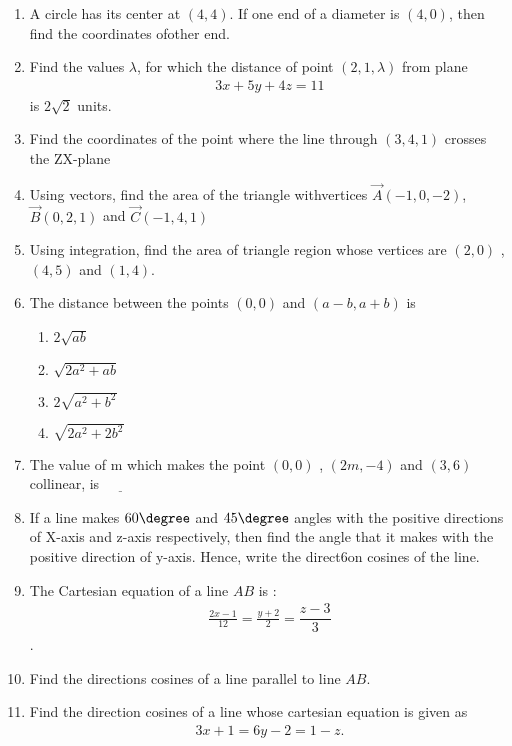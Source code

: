 \begin{enumerate}
\begin{enumerate}
\end{enumerate}
\item A circle has its center at $(4,4)$. If one end of a diameter is $(4,0)$, then find the coordinates ofother end.
\item Find the values $\lambda$, for which the distance of point $( 2,1, \lambda)$ from plane \begin{align}3x+5y+4z=11\end{align} is $2\sqrt{2}$ units.                            
\item Find the coordinates of the point where the line through $(3,4,1)$ crosses the ZX-plane
\item Using vectors, find the area of the triangle withvertices $\vec{A}(-1, 0, -2)$, $\vec{B}(0, 2, 1)$ and $\vec{C}(-1, 4,1)$ 
\item Using integration, find the area of triangle region whose vertices are $(2,0)$ , $(4,5)$ and $(1,4)$.
\item The distance between the points $(0,0)$ and $(a-b, a+b)$ is                                             
\begin{enumerate}                                     
\item $2{\sqrt{ab}}$                                  
\item $\sqrt{2a^2 + ab}$                              
\item $ 2\sqrt{a^2 + b^2}$                            
\item $ \sqrt{2a^2 + 2b^2}$                           
\end{enumerate}                                       
\item The value of m which makes the point $(0,0)$ , $( 2m,-4)$ and $(3,6)$ collinear, is $\underline{\hspace{1cm}}$
\item  If a line makes $60\degree$  and $45\degree$ angles with the positive directions of X-axis and z-axis respectively, then find the angle that it makes with the positive direction of y-axis. Hence, write the direct6on cosines of the line.
\item The Cartesian equation of a line $AB$ is :         \begin{align}\frac{2x-1}{12} = \frac{ y+2}{2} = \dfrac{z-3}{3}\end{align}.                        
\item Find the directions cosines of a line parallel to line $AB$.                                             
\item Find the direction cosines of a line whose cartesian equation is given as \begin{align}3x + 1 = 6y - 2 = 1 - z.\end{align}  

\end{enumerate}
